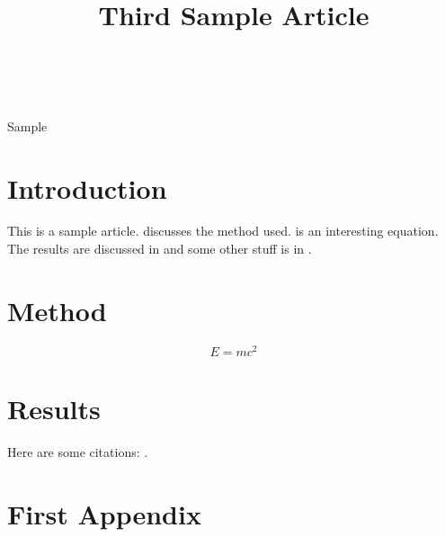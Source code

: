 \documentclass[wcp]{jmlr}
\title[Article 3]{Third Sample Article}
\author{\Name{John Smith}\Email{js@sample.com}\\
\addr{University of No Where}}
\begin{document}
\maketitle

\begin{abstract}
\lipsum[1]
\end{abstract}
\begin{keywords}
Sample
\end{keywords}

\section{Introduction}

This is a sample article.  discusses
the method used.  is an interesting 
equation. The results are discussed in 
and some other stuff is in .

\lipsum

\section{Method}\label{sec:method}

\lipsum

\begin{equation}\label{eq:emc2}
E = mc^2
\end{equation}

\section{Results}\label{sec:results}

\lipsum

Here are some citations: \citet{guyon-elisseeff-03,guyon2007causalreport}.



\appendix
\section{First Appendix}\label{apd:first}

\lipsum
\end{document}
